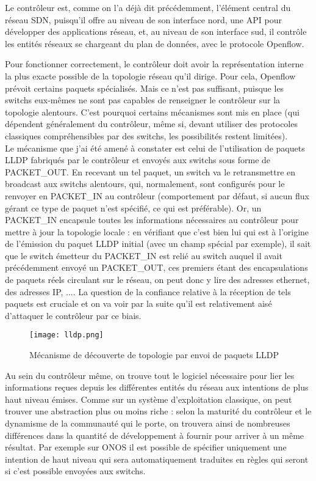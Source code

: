 Le contrôleur est, comme on l'a déjà dit précédemment, l'élément central du réseau SDN, puisqu'il offre au niveau de son interface nord, une API pour développer des applications réseau, et, au niveau de son interface sud, il contrôle les entités réseaux se chargeant du plan de données, avec le protocole Openflow.

Pour fonctionner correctement, le contrôleur doit avoir la représentation interne la plus exacte possible de la topologie réseau qu'il dirige. Pour cela, Openflow prévoit certains paquets spécialisés. Mais ce n'est pas suffisant, puisque les switchs eux-mêmes ne sont pas capables de renseigner le contrôleur sur la topologie alentours. C'est pourquoi certains mécanismes sont mis en place (qui dépendent généralement du contrôleur, même si, devant utiliser des protocoles classiques compréhensibles par des switchs, les possibilités restent limitées).\\
Le mécanisme que j'ai été amené à constater est celui de l'utilisation de paquets LLDP fabriqués par le contrôleur et envoyés aux switchs sous forme de PACKET\_OUT. En recevant un tel paquet, un switch va le retransmettre en broadcast aux switchs alentours, qui, normalement, sont configurés pour le renvoyer en PACKET\_IN au contrôleur (comportement par défaut, si aucun flux gérant ce type de paquet n'est spécifié, ce qui est préférable). Or, un PACKET\_IN encapsule toutes les informations nécessaires au contrôleur pour mettre à jour la topologie locale : en vérifiant que c'est bien lui qui est à l'origine de l'émission du paquet LLDP initial (avec un champ spécial par exemple), il sait que le switch émetteur du PACKET\_IN est relié au switch auquel il avait précédemment envoyé un PACKET\_OUT, ces premiers étant des encapsulations de paquets réels circulant sur le réseau, on peut donc y lire des adresses ethernet, des adresses IP, .... La question de la confiance relative à la réception de tels paquets est cruciale et on va voir par la suite qu'il est relativement aisé d'attaquer le contrôleur par ce biais.\\

\begin{figure}[h]
  	\centering
  	\texttt{[image: lldp.png]}
  	\caption{Mécanisme de découverte de topologie par envoi de paquets LLDP}
\end{figure}

Au sein du contrôleur même, on trouve tout le logiciel nécessaire pour lier les informations reçues depuis les différentes entités du réseau aux intentions de plus haut niveau émises. Comme sur un système d'exploitation classique, on peut trouver une abstraction plus ou moins riche : selon la maturité du contrôleur et le dynamisme de la communauté qui le porte, on trouvera ainsi de nombreuses différences dans la quantité de développement à fournir pour arriver à un même résultat. Par exemple sur ONOS il est possible de spécifier uniquement une intention de haut niveau qui sera automatiquement traduites en règles qui seront si c'est possible envoyées aux switchs.\\

